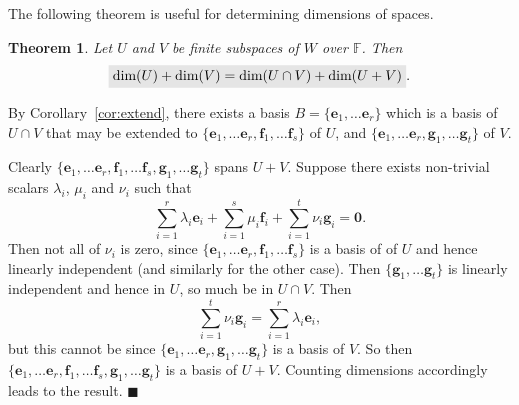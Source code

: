 \documentclass[letter-paper]{tufte-book}
\newtheorem{theorem}{\color{pastel-blue}Theorem}[section]
\newenvironment{proof}[1][Proof]{\begin{trivlist}
\item[\hskip \labelsep {\bfseries #1}]}{\end{trivlist}}
\newcommand{\eb}{{\boldsymbol{e}}}
\newcommand{\qed}{\hfill$\blacksquare$}
\newcommand{\highlight}[1]{\mathchoice%
  {\colorbox{black!10}{$\displaystyle#1$}}%
  {\colorbox{black!10}{$\textstyle#1$}}%
  {\colorbox{black!10}{$\scriptstyle#1$}}%
  {\colorbox{black!10}{$\scriptscriptstyle#1$}}}%
\begin{document}
The following theorem is useful for determining dimensions of spaces.

\begin{theorem}\label{thm:subspace_dim}
  Let $U$ and $V$ be finite subspaces of $W$ over $\mathbb{F}$. Then
  \begin{equation}
    \highlight{\mbox{dim}(U) + \mbox{dim}(V) = \mbox{dim}(U \cap V) + \mbox{dim}(U+V)}.
  \end{equation}
\end{theorem}

\begin{proof}
  By Corollary~\ref{cor:extend}, there exists a basis $B=\{\eb_1, \ldots
  \eb_r\}$ which is a basis of $U \cap V$ that may be extended to $\{\eb_1,
  \ldots \eb_r, \boldsymbol{f}_1, \ldots \boldsymbol{f}_s\}$ of $U$, and
  $\{\eb_1, \ldots \eb_r, \boldsymbol{g}_1, \ldots \boldsymbol{g}_t\}$ of $V$.
  
  Clearly $\{\eb_1, \ldots \eb_r, \boldsymbol{f}_1, \ldots \boldsymbol{f}_s,
  \boldsymbol{g}_1, \ldots \boldsymbol{g}_t\}$ spans $U+V$. Suppose there exists
  non-trivial scalars $\lambda_i$, $\mu_i$ and $\nu_i$ such that
  \begin{equation*}
    \sum_{i=1}^r \lambda_i\eb_i + \sum_{i=1}^s \mu_i\boldsymbol{f}_i + \sum_{i=1}^t \nu_i\boldsymbol{g}_i = \boldsymbol{0}.
  \end{equation*}
  Then not all of $\nu_i$ is zero, since $\{\eb_1,
  \ldots \eb_r, \boldsymbol{f}_1, \ldots \boldsymbol{f}_s\}$ is a basis of of
  $U$ and hence linearly independent (and similarly for the other case). Then
  $\{\boldsymbol{g}_1, \ldots \boldsymbol{g}_t\}$ is linearly independent and
  hence in $U$, so much be in $U \cap V$. Then
  \begin{equation*}
    \sum_{i=1}^t \nu_i\boldsymbol{g}_i = \sum_{i=1}^r \lambda_i\eb_i,
  \end{equation*}
  but this cannot be since $\{\eb_1, \ldots \eb_r, \boldsymbol{g}_1, \ldots
  \boldsymbol{g}_t\}$ is a basis of $V$. So then $\{\eb_1, \ldots \eb_r,
  \boldsymbol{f}_1, \ldots \boldsymbol{f}_s, \boldsymbol{g}_1, \ldots
  \boldsymbol{g}_t\}$ is a basis of $U+V$. Counting dimensions accordingly leads
  to the result. \qed
\end{proof}
\end{document}
